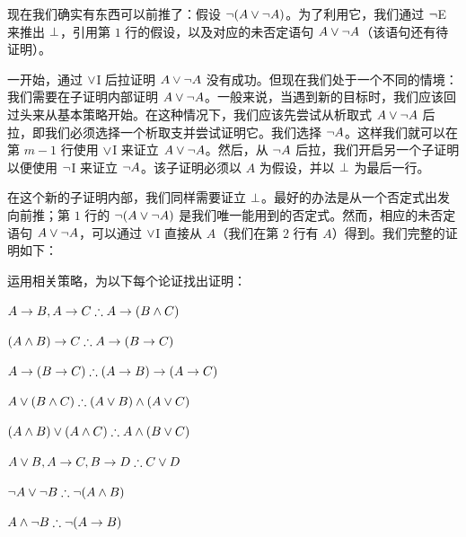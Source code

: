 现在我们确实有东西可以前推了：假设 $\neg(A \vee \neg A)$。为了利用它，我们通过 $\neg$E 来推出 $\bot$，引用第 $1$ 行的假设，以及对应的未否定语句 $A \vee \neg A$（该语句还有待证明）。

\begin{fitchproof}
	\open
	\AS
	\ellipsesline
	\close
\end{fitchproof}

一开始，通过 $\vee$I 后拉证明 $A \vee\neg A$ 没有成功。但现在我们处于一个不同的情境：我们需要在子证明内部证明 $A \vee\neg A$。一般来说，当遇到新的目标时，我们应该回过头来从基本策略开始。在这种情况下，我们应该先尝试从析取式 $A \vee \neg A$ 后拉，即我们必须选择一个析取支并尝试证明它。我们选择 $\neg A$。这样我们就可以在第 $m - 1$ 行使用 $\vee$I 来证立 $A \vee \neg A$。然后，从 $\neg A$ 后拉，我们开启另一个子证明以便使用 $\neg$I 来证立 $\neg A$。该子证明必须以 $A$ 为假设，并以 $\bot$ 为最后一行。

\begin{fitchproof}
	\open
	\AS
	\open
	\AS
	\ellipsesline
	\close
	\close
\end{fitchproof}

在这个新的子证明内部，我们同样需要证立 $\bot$。最好的办法是从一个否定式出发向前推；第 $1$ 行的 $\neg(A \vee \neg A)$ 是我们唯一能用到的否定式。然而，相应的未否定语句 $A \vee \neg A$，可以通过 $\vee$I 直接从 $A$（我们在第 $2$ 行有 $A$）得到。我们完整的证明如下：

\begin{fitchproof}
	\open
	\AS
	\open
	\AS
	\close
	\close
\end{fitchproof}

\practiceproblems

\problempart
运用相关策略，为以下每个论证找出证明：

\begin{compactlist}
\item $A \eif B, A \eif C \therefore A \eif (B \eand C)$
\item $(A \eand B) \eif C \therefore A \eif (B \eif C)$
\item $A \eif (B \eif C) \therefore (A \eif B) \eif (A \eif C)$
\item $A \eor (B \eand C) \therefore (A \eor B) \eand (A \eor C)$
\item $(A \eand B) \eor (A \eand C) \therefore A \eand (B \eor C)$
\item $A \eor B, A \eif C, B \eif D \therefore C \eor D$
\item $\enot A \lor \enot B \therefore \enot(A \eand B)$
\item $A \eand \enot B \therefore \enot(A \eif B)$
\end{compactlist}

